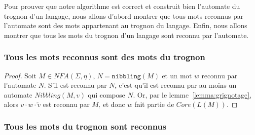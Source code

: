 Pour prouver que notre algorithme est correct et construit bien l'automate
du trognon d'un langage, nous allons d'abord montrer que tous mots reconnus
par l'automate sont des mots appartenant au trognon du langage. Enfin, nous
allons montrer que tous les mots du trognon d'un langage sont reconnu par
l'automate.

\subsubsection{Tous les mots reconnus sont des mots du trognon}

\begin{proof}
  Soit \(M \in NFA(\Sigma, \eta)\), \(N = \texttt{nibbling}(M)\) et un mot
  \(w\) reconnu par l'automate \(N\). S'il est reconnu par \(N\), c'est qu'il
  est reconnu par au moins un automate \(Nibbling(M, v)\) qui compose \(N\).
  Or, par le lemme~\ref{lemma:grignotage}, alors \(v \cdot w \cdot
  \overleftarrow{v}\) est reconnu par \(M\), et donc \(w\) fait partie de
  \(Core(L(M))\).
\end{proof}

\subsubsection{Tous les mots du trognon sont reconnus}

